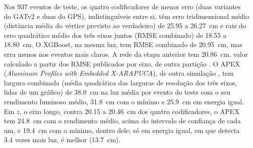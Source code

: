 Nos \num{937} eventos de teste, os quatro codificadores de menor erro (duas variantes do GATv2 e duas do GPS), indistinguíveis entre si, têm erro tridimensional médio (distância média do vértice previsto ao verdadeiro) de \num{25.95} a \qty{26.27}{\cm} e raiz do erro quadrático médio dos três eixos juntos (RMSE combinado) de \num{18.55} a \qty{18.80}{\cm}. O XGBoost, na mesma luz, tem RMSE combinado de \qty{20.95}{\cm}, mas erra menos nos eventos mais claros. A rede da etapa anterior tem \qty{20.86}{\cm}, valor calculado a partir dos RMSE publicados por eixo, de outra partição \cite{vicentin2024study}. O APEX (\textit{Aluminum Profiles with Embedded X-ARAPUCA}), de outra simulação \cite{marinho2025apex}, tem largura combinada (média quadrática das larguras de resolução dos três eixos, lidas de um gráfico) de \qty{38.0}{\cm} na luz média por evento do teste com o seu rendimento luminoso médio, \qty{31.8}{\cm} com o mínimo e \qty{25.9}{\cm} em energia igual. Em $z$, o eixo longo, contra \num{20.15} a \qty{20.46}{\cm} dos quatro codificadores, o APEX tem \qty{24.8}{\cm} com o rendimento médio, acima do intervalo de confiança de cada um, e \qty{19.4}{\cm} com o mínimo, dentro dele; só em energia igual, em que detecta \num{3.4} vezes mais luz, é melhor (\qty{13.7}{\cm}).

